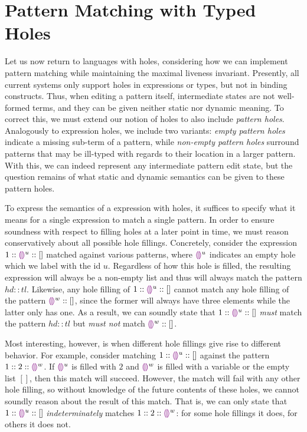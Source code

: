 \section{Pattern Matching with Typed Holes}

Let us now return to languages with holes, considering how we can implement pattern matching while maintaining the maximal liveness invariant. Presently, all current systems only support holes in expressions or types, but not in binding constructs. Thus, when editing a pattern itself, intermediate states are not well-formed terms, and they can be given neither static nor dynamic meaning. To correct this, we must extend our notion of holes to also include \emph{pattern holes}. Analogously to expression holes, we include two variants: \emph{empty pattern holes} indicate a missing sub-term of a pattern, while \emph{non-empty pattern holes} surround patterns that may be ill-typed with regards to their location in a larger pattern. With this, we can indeed represent any intermediate pattern edit state, but the question remains of what static and dynamic semantics can be given to these pattern holes.

To express the semantics of a  expression with holes, it suffices to specify what it means for a single expression to match a single pattern. In order to ensure soundness with respect to filling holes at a later point in time, we must reason conservatively about all possible hole fillings. Concretely, consider the expression $1 :: \textcolor{violet}{\llparenthesis}\textcolor{violet}{\rrparenthesis}^{u} :: []$ matched against various patterns, where $\textcolor{violet}{\llparenthesis}\textcolor{violet}{\rrparenthesis}^{u}$ indicates an empty hole which we label with the id $u$. Regardless of how this hole is filled, the resulting expression will always be a non-empty list and thus will always match the pattern $hd :: tl$. Likewise, any hole filling of $1 :: \textcolor{violet}{\llparenthesis}\textcolor{violet}{\rrparenthesis}^{u} :: []$ cannot match any hole filling of the pattern $\textcolor{violet}{\llparenthesis}\textcolor{violet}{\rrparenthesis}^{w} :: []$, since the former will always have three elements while the latter only has one. As a result, we can soundly state that $1 :: \textcolor{violet}{\llparenthesis}\textcolor{violet}{\rrparenthesis}^{u} :: []$ \emph{must} match the pattern $hd :: tl$ but \emph{must not} match $\textcolor{violet}{\llparenthesis}\textcolor{violet}{\rrparenthesis}^{w} :: []$. 

Most interesting, however, is when different hole fillings give rise to different behavior. For example, consider matching $1 :: \textcolor{violet}{\llparenthesis}\textcolor{violet}{\rrparenthesis}^{u} :: []$ against the pattern $1 :: 2 :: \textcolor{violet}{\llparenthesis}\textcolor{violet}{\rrparenthesis}^{w}$. If $\textcolor{violet}{\llparenthesis}\textcolor{violet}{\rrparenthesis}^{u}$ is filled with $2$ and $\textcolor{violet}{\llparenthesis}\textcolor{violet}{\rrparenthesis}^{w}$ is filled with a variable or the empty list $[]$, then this match will succeed. However, the match will fail with any other hole filling, so without knowledge of the future contents of these holes, we cannot soundly reason about the result of this match. That is, we can only state that $1 :: \textcolor{violet}{\llparenthesis}\textcolor{violet}{\rrparenthesis}^{u} :: []$ \emph{indeterminately} matches $1 :: 2 :: \textcolor{violet}{\llparenthesis}\textcolor{violet}{\rrparenthesis}^{w}$: for some hole fillings it does, for others it does not.

